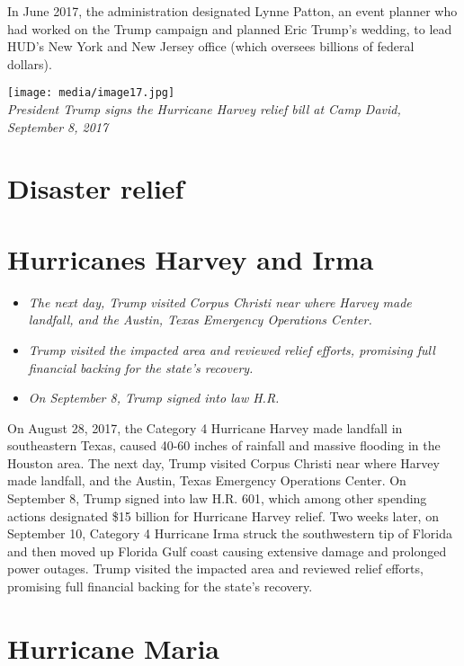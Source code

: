 In June 2017, the administration designated Lynne Patton, an event
planner who had worked on the Trump campaign and planned Eric Trump's
wedding, to lead HUD's New York and New Jersey office (which oversees
billions of federal dollars).

\texttt{[image: media/image17.jpg]}\\
\emph{President Trump signs the Hurricane Harvey relief bill at Camp
David, September 8, 2017}

\section{Disaster relief}\label{disaster-relief}

\section{Hurricanes Harvey and Irma}\label{hurricanes-harvey-and-irma}

\begin{itemize}
\item
  \emph{The next day, Trump visited Corpus Christi near where Harvey
  made landfall, and the Austin, Texas Emergency Operations Center.}
\item
  \emph{Trump visited the impacted area and reviewed relief efforts,
  promising full financial backing for the state's recovery.}
\item
  \emph{On September 8, Trump signed into law H.R.}
\end{itemize}

On August 28, 2017, the Category 4 Hurricane Harvey made landfall in
southeastern Texas, caused 40-60 inches of rainfall and massive flooding
in the Houston area. The next day, Trump visited Corpus Christi near
where Harvey made landfall, and the Austin, Texas Emergency Operations
Center. On September 8, Trump signed into law H.R. 601, which among
other spending actions designated \$15 billion for Hurricane Harvey
relief. Two weeks later, on September 10, Category 4 Hurricane Irma
struck the southwestern tip of Florida and then moved up Florida Gulf
coast causing extensive damage and prolonged power outages. Trump
visited the impacted area and reviewed relief efforts, promising full
financial backing for the state's recovery.

\section{Hurricane Maria}\label{hurricane-maria}

